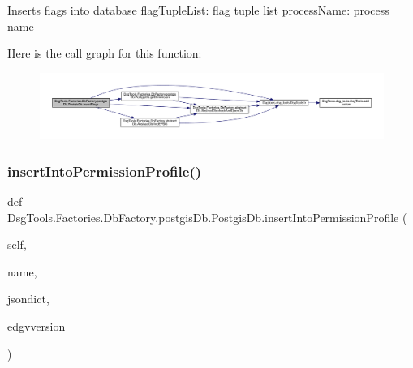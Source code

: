 \begin{DoxyVerb}Inserts flags into database
flagTupleList: flag tuple list
processName: process name
\end{DoxyVerb}
 Here is the call graph for this function\+:
\nopagebreak
\begin{figure}[H]
\begin{center}
\leavevmode
\includegraphics[width=350pt]{class_dsg_tools_1_1_factories_1_1_db_factory_1_1postgis_db_1_1_postgis_db_acaefaf8ad3940bba3d485564aed4846c_cgraph}
\end{center}
\end{figure}
\mbox{\label{class_dsg_tools_1_1_factories_1_1_db_factory_1_1postgis_db_1_1_postgis_db_aefad0da85c6707d0b4c8e52781873d63}} 
\subsubsection{\texorpdfstring{insert\+Into\+Permission\+Profile()}{insertIntoPermissionProfile()}}
{\footnotesize\ttfamily def Dsg\+Tools.\+Factories.\+Db\+Factory.\+postgis\+Db.\+Postgis\+Db.\+insert\+Into\+Permission\+Profile (\begin{DoxyParamCaption}\item[{}]{self,  }\item[{}]{name,  }\item[{}]{jsondict,  }\item[{}]{edgvversion }\end{DoxyParamCaption})}

